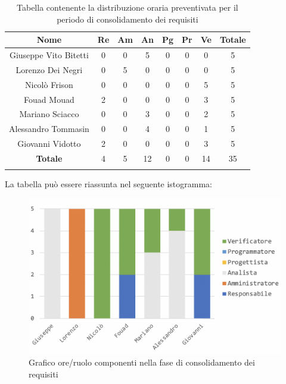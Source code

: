 			\begin{longtable}{|c|c|c|c|c|c|c|c|}
				\hline
				\rowcolor{lighter-grayer}
				\textbf{Nome} & \textbf{Re} & \textbf{Am} & \textbf{An} & \textbf{Pg}  & \textbf{Pr}   & \textbf{Ve} & \textbf{Totale} \\
				\hline
				\endfirsthead
				
				\hline
				Giuseppe Vito Bitetti & 0 & 0 & 5 & 0 & 0 & 0 & 5\\
				\hline
				\hline
				Lorenzo Dei Negri & 0 & 5 & 0 & 0 & 0 & 0 & 5\\
				\hline
				\hline
				Nicolò Frison & 0 & 0 & 0 & 0 & 0 & 5 & 5\\
				\hline
				\hline
				Fouad Mouad & 2 & 0 & 0 & 0 & 0 & 3 & 5\\
				\hline
				\hline
				Mariano Sciacco & 0 & 0 & 3 & 0 & 0 & 2 & 5\\
				\hline
				\hline
				Alessandro Tommasin & 0 & 0 & 4 & 0 & 0 & 1 & 5\\
				\hline
				\hline
				Giovanni Vidotto & 2 & 0 & 0 & 0 & 0 & 3 & 5\\
				\hline 
				\textbf{Totale} & 4 &  5 & 12 & 0 & 0 & 14 & 35\\
				\hline
				\caption{Tabella contenente la distribuzione oraria preventivata per il periodo di consolidamento dei requisiti}
			\end{longtable}
			\pagebreak
		
			La tabella può essere riassunta nel seguente istogramma:
			\begin{figure}[H]
				\centering
				\includegraphics[width=0.8\linewidth]{./images/consRequisiti1.png}
				\caption{Grafico ore/ruolo componenti nella fase di consolidamento dei requisiti}
				\label{fig:grafico suddivione ruoli fase consolidamento requisiti}
			\end{figure}
		
